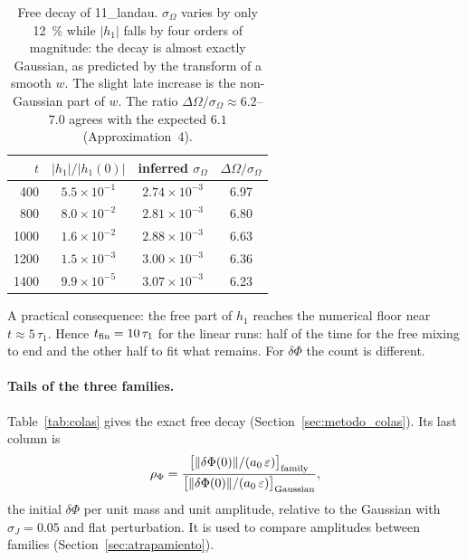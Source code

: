 \documentclass[11pt,a4paper]{article}
\begin{document}
\begin{table}[!htbp]
\centering
\begin{tabular}{rccc}
\toprule
$t$ & $|h_1|/|h_1(0)|$ & inferred $\sigma_\Omega$ & $\Delta\Omega/\sigma_\Omega$\\
\midrule
400 & $5.5\times10^{-1}$ & $2.74\times10^{-3}$ & 6.97\\
800 & $8.0\times10^{-2}$ & $2.81\times10^{-3}$ & 6.80\\
1000 & $1.6\times10^{-2}$ & $2.88\times10^{-3}$ & 6.63\\
1200 & $1.5\times10^{-3}$ & $3.00\times10^{-3}$ & 6.36\\
1400 & $9.9\times10^{-5}$ & $3.07\times10^{-3}$ & 6.23\\
\bottomrule
\end{tabular}
\caption{Free decay of 11\_landau. $\sigma_\Omega$ varies by only \SI{12}{\%} while $|h_1|$ falls by
four orders of magnitude: the decay is almost exactly Gaussian, as predicted by the
transform of a smooth $w$. The slight late increase is the non-Gaussian part of $w$. The
ratio $\Delta\Omega/\sigma_\Omega\approx6.2$--$7.0$ agrees with the expected $6.1$ (Approximation~4).}
\label{tab:libre}
\end{table}

A practical consequence: the free part of $h_1$ reaches the numerical floor near
$t\approx5\,\tau_1$. Hence $t_{\rm fin}=10\,\tau_1$ for the linear runs: half of the time for the free
mixing to end and the other half to fit what remains. For $\delta\Phi$ the count is
different.

\paragraph{Tails of the three families.} Table~\ref{tab:colas} gives the exact free decay
(Section~\ref{sec:metodo_colas}). Its last column is
\[
  \rho_\Phi=\frac{\big[\|\delta\Phi(0)\|/(a_0\,\varepsilon)\big]_{\rm family}}
               {\big[\|\delta\Phi(0)\|/(a_0\,\varepsilon)\big]_{\rm Gaussian}} ,
\]
the initial $\delta\Phi$ per unit mass and unit amplitude, relative to the Gaussian with
$\sigma_J=0.05$ and flat perturbation. It is used to compare amplitudes between families
(Section~\ref{sec:atrapamiento}).
\end{document}
